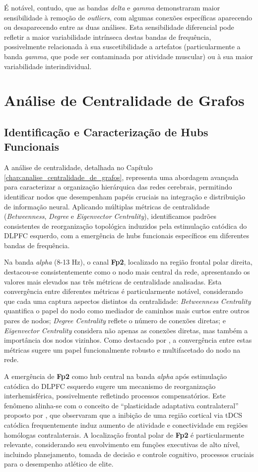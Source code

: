 É notável, contudo, que as bandas \emph{delta} e \emph{gamma} demonstraram maior sensibilidade à remoção de \textit{outliers}, com algumas conexões específicas aparecendo ou desaparecendo entre as duas análises. Esta sensibilidade diferencial pode refletir a maior variabilidade intrínseca destas bandas de frequência, possivelmente relacionada à sua suscetibilidade a artefatos (particularmente a banda \emph{gamma}, que pode ser contaminada por atividade muscular) ou à sua maior variabilidade interindividual.

\section{Análise de Centralidade de Grafos}

\subsection{Identificação e Caracterização de Hubs Funcionais}
A análise de centralidade, detalhada no Capítulo \ref{chap:analise_centralidade_de_grafos}, representa uma abordagem avançada para caracterizar a organização hierárquica das redes cerebrais, permitindo identificar nodos que desempenham papéis cruciais na integração e distribuição de informação neural. Aplicando múltiplas métricas de centralidade (\textit{Betweenness}, \textit{Degree} e \textit{Eigenvector Centrality}), identificamos padrões consistentes de reorganização topológica induzidos pela estimulação catódica do DLPFC esquerdo, com a emergência de hubs funcionais específicos em diferentes bandas de frequência.

Na banda \emph{alpha} (8-13 Hz), o canal \textbf{Fp2}, localizado na região frontal polar direita, destacou-se consistentemente como o nodo mais central da rede, apresentando os valores mais elevados nas três métricas de centralidade analisadas. Esta convergência entre diferentes métricas é particularmente notável, considerando que cada uma captura aspectos distintos da centralidade: \textit{Betweenness Centrality} quantifica o papel do nodo como mediador de caminhos mais curtos entre outros pares de nodos; \textit{Degree Centrality} reflete o número de conexões diretas; e \textit{Eigenvector Centrality} considera não apenas as conexões diretas, mas também a importância dos nodos vizinhos. Como destacado por \cite{bullmore2009complex}, a convergência entre estas métricas sugere um papel funcionalmente robusto e multifacetado do nodo na rede.

A emergência de \textbf{Fp2} como hub central na banda \emph{alpha} após estimulação catódica do DLPFC esquerdo sugere um mecanismo de reorganização interhemisférica, possivelmente refletindo processos compensatórios. Este fenômeno alinha-se com o conceito de ``plasticidade adaptativa contralateral'' proposto por \cite{kunze2014high}, que observaram que a inibição de uma região cortical via tDCS catódica frequentemente induz aumento de atividade e conectividade em regiões homólogas contralaterais. A localização frontal polar de \textbf{Fp2} é particularmente relevante, considerando seu envolvimento em funções executivas de alto nível, incluindo planejamento, tomada de decisão e controle cognitivo, processos cruciais para o desempenho atlético de elite.

